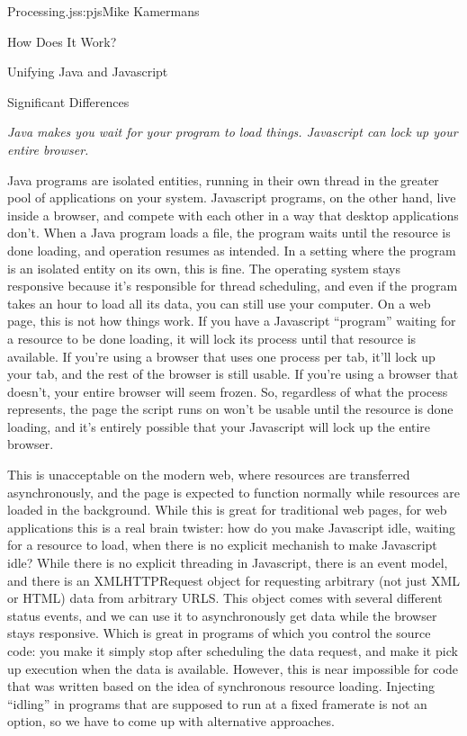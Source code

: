\begin{aosachapter}{Processing.js}{s:pjs}{Mike Kamermans}
\begin{aosasect1}{How Does It Work?}
\begin{aosasect2}{Unifying Java and Javascript}
\end{aosasect2}

\end{aosasect1}

\begin{aosasect1}{Significant Differences}

\emph{Java makes you wait for your program to load things. Javascript can lock up your entire browser.}

Java programs are isolated entities, running in their own thread in
the greater pool of applications on your system. Javascript programs,
on the other hand, live inside a browser, and compete with each other
in a way that desktop applications don't. When a Java program loads a
file, the program waits until the resource is done loading, and
operation resumes as intended. In a setting where the program is an
isolated entity on its own, this is fine. The operating system stays
responsive because it's responsible for thread scheduling, and even if
the program takes an hour to load all its data, you can still use your
computer. On a web page, this is not how things work. If you have a
Javascript ``program'' waiting for a resource to be done loading, it
will lock its process until that resource is available. If you're
using a browser that uses one process per tab, it'll lock up your tab,
and the rest of the browser is still usable. If you're using a browser
that doesn't, your entire browser will seem frozen. So, regardless of
what the process represents, the page the script runs on won't be
usable until the resource is done loading, and it's entirely possible
that your Javascript will lock up the entire browser.

This is unacceptable on the modern web, where resources are
transferred asynchronously, and the page is expected to function
normally while resources are loaded in the background. While this is
great for traditional web pages, for web applications this is a real
brain twister: how do you make Javascript idle, waiting for a resource
to load, when there is no explicit mechanish to make Javascript idle?
While there is no explicit threading in Javascript, there is an event
model, and there is an XMLHTTPRequest object for requesting arbitrary
(not just XML or HTML) data from arbitrary URLS. This object comes
with several different status events, and we can use it to
asynchronously get data while the browser stays responsive. Which is
great in programs of which you control the source code: you make it
simply stop after scheduling the data request, and make it pick up
execution when the data is available. However, this is near impossible
for code that was written based on the idea of synchronous resource
loading. Injecting ``idling'' in programs that are supposed to run at a
fixed framerate is not an option, so we have to come up with
alternative approaches.


\end{aosasect1}
\end{aosachapter}
